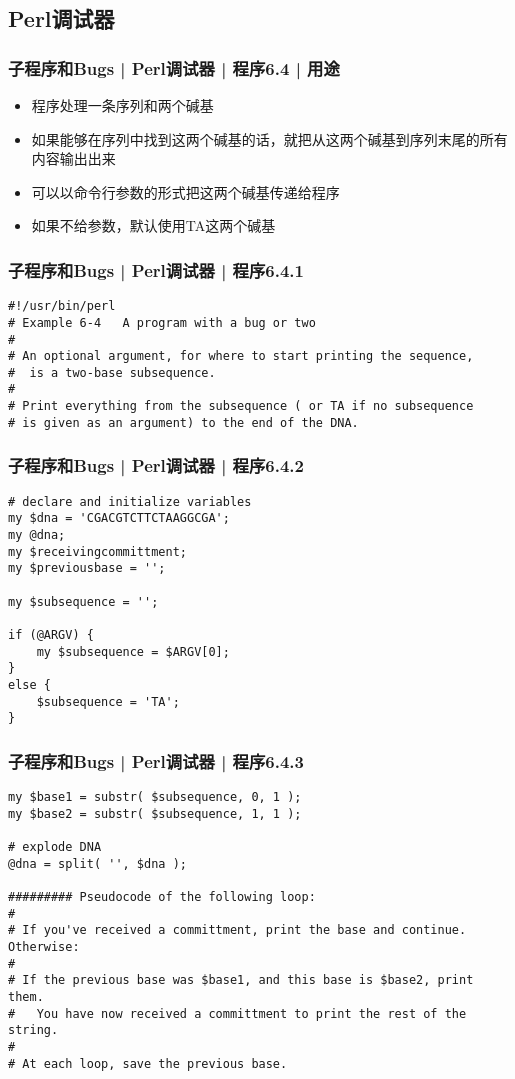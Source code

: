 \subsection{Perl调试器}
\begin{frame}[fragile]
  \frametitle{子程序和Bugs | Perl调试器 | 程序6.4 | 用途}
  \begin{itemize}
    \item 程序处理一条序列和两个碱基
    \item 如果能够在序列中找到这两个碱基的话，就把从这两个碱基到序列末尾的所有内容输出出来
    \item 可以以命令行参数的形式把这两个碱基传递给程序
    \item 如果不给参数，默认使用TA这两个碱基
  \end{itemize}
\end{frame}

\begin{frame}[fragile]
  \frametitle{子程序和Bugs | Perl调试器 | 程序6.4.1}
\begin{lstlisting}[firstnumber=1]
#!/usr/bin/perl
# Example 6-4   A program with a bug or two
#
# An optional argument, for where to start printing the sequence,
#  is a two-base subsequence.
#
# Print everything from the subsequence ( or TA if no subsequence
# is given as an argument) to the end of the DNA.
\end{lstlisting}
\end{frame}

\begin{frame}[fragile]
  \frametitle{子程序和Bugs | Perl调试器 | 程序6.4.2}
\begin{lstlisting}[firstnumber=10]
# declare and initialize variables
my $dna = 'CGACGTCTTCTAAGGCGA';
my @dna;
my $receivingcommittment;
my $previousbase = '';

my $subsequence = '';

if (@ARGV) {
    my $subsequence = $ARGV[0];
}
else {
    $subsequence = 'TA';
}
\end{lstlisting}
\end{frame}

\begin{frame}[fragile]
  \frametitle{子程序和Bugs | Perl调试器 | 程序6.4.3}
\begin{lstlisting}[firstnumber=25,basicstyle=\small\tt]
my $base1 = substr( $subsequence, 0, 1 );
my $base2 = substr( $subsequence, 1, 1 );

# explode DNA
@dna = split( '', $dna );

######### Pseudocode of the following loop:
#
# If you've received a committment, print the base and continue.  Otherwise:
#
# If the previous base was $base1, and this base is $base2, print them.
#   You have now received a committment to print the rest of the string.
#
# At each loop, save the previous base.
\end{lstlisting}
\end{frame}

